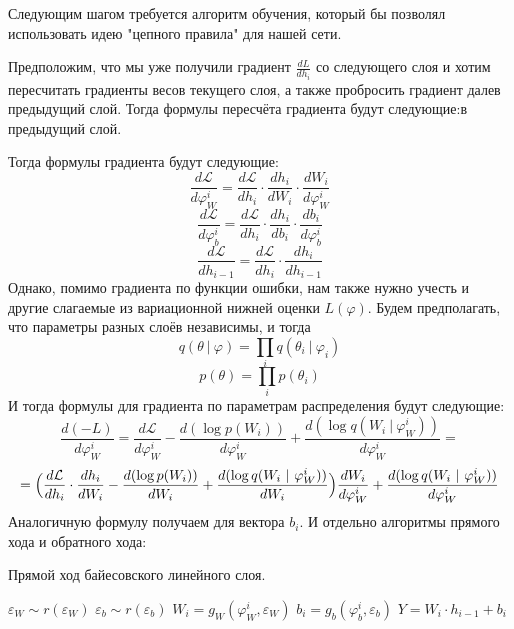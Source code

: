 Следующим шагом требуется алгоритм обучения, который бы позволял использовать идею "цепного правила" для нашей сети.

Предположим, что мы уже получили градиент $\frac{dL}{dh_i}$ со следующего слоя и хотим пересчитать градиенты весов текущего слоя, а также пробросить градиент далев предыдущий слой. Тогда формулы пересчёта градиента будут следующие:в предыдущий слой.

Тогда формулы градиента будут следующие:
$$\frac{d\mathcal{L}}{d\varphi_W^i} = \frac{d\mathcal{L}}{dh_i} \cdot \frac{dh_i}{dW_i} \cdot \frac{dW_i}{d\varphi_W^i}$$
$$\frac{d\mathcal{L}}{d\varphi_b^i} = \frac{d\mathcal{L}}{dh_i} \cdot \frac{dh_i}{db_i} \cdot \frac{db_i}{d\varphi_b^i}$$
$$\frac{d\mathcal{L}}{dh_{i-1}} = \frac{d\mathcal{L}}{dh_i} \cdot \frac{dh_i}{dh_{i-1}}$$
Однако, помимо градиента по функции ошибки, нам также нужно учесть и другие слагаемые из вариационной нижней оценки $L(\varphi)$. Будем предполагать, что
 параметры разных слоёв независимы, и тогда
$$q(\theta\ |\ \varphi) = \prod_i q(\theta_i\ |\ \varphi_i)$$
$$p(\theta) = \prod_i p(\theta_i)$$
И тогда формулы для градиента по параметрам распределения будут следующие:
$$\frac{d(-L)}{d\varphi_W^i} = \frac{d\mathcal{L}}{d\varphi_W^i} - \frac{d(\log p(W_i))}{d\varphi_W^i} + \frac{d(\log q(W_i\ |\ \varphi_W^i))}{d\varphi_W^i}=$$
$$=\Bigl(\frac{d\mathcal{L}}{dh_i} \cdot \frac{dh_i}{dW_i} - \frac{d(\log p(W_i))}{dW_i} + \frac{d(\log q(W_i\ |\ \varphi_W^i))}{dW_i}\Bigr) \frac{dW_i}{d\varphi_W^i} + \frac{d(\log q(W_i\ |\ \varphi_W^i))}{d\varphi_W^i}$$
Аналогичную формулу получаем для вектора $b_i$.
И отдельно алгоритмы прямого хода и обратного хода:
\begin{algorithm}
\caption{Прямой ход байесовского линейного слоя.}
\begin{algorithmic}
    \State $\varepsilon_W \sim r(\varepsilon_W)$
    \State $\varepsilon_b \sim r(\varepsilon_b)$
    \State $W_i = g_{W}(\varphi_W^i, \varepsilon_W)$
    \State $b_i = g_{b}(\varphi_b^i, \varepsilon_b)$
    \State $Y = W_i \cdot h_{i-1} + b_i$
    \State {}
\EndProcedure
\end{algorithmic}
\end{algorithm}
